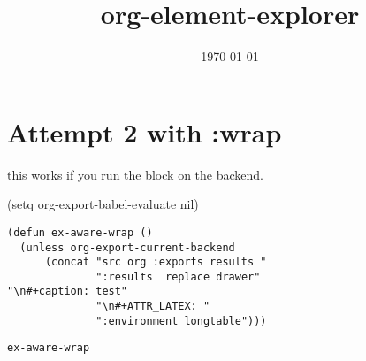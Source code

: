 \documentclass[11pt]{article}
\date{\today}
\title{org-element-explorer}
\begin{document}
\section{Attempt 2 with :wrap}
\label{sec-1}
this works if you run the block on the backend.

(setq org-export-babel-evaluate nil)
\begin{verbatim}
(defun ex-aware-wrap ()
  (unless org-export-current-backend
      (concat "src org :exports results "
              ":results  replace drawer"
"\n#+caption: test"
              "\n#+ATTR_LATEX: "
              ":environment longtable")))
\end{verbatim}

\begin{verbatim}
ex-aware-wrap
\end{verbatim}
\end{document}
